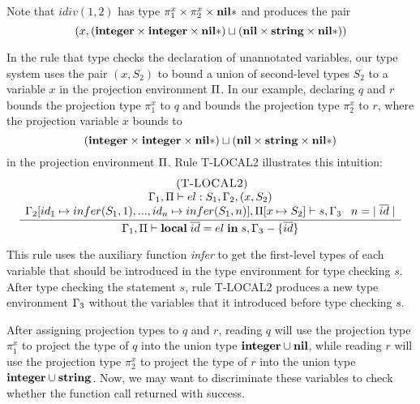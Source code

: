 Note that $idiv(1, 2)$ has type
$\pi_{1}^{x} \times \pi_{2}^{x} \times \mathbf{nil}{*}$ and produces the pair
\[
(x,(\mathbf{integer} \times \mathbf{integer} \times \mathbf{nil}{*}) \sqcup (\mathbf{nil} \times \mathbf{string} \times \mathbf{nil}{*})) 
\]

In the rule that type checks the declaration of unannotated variables,
our type system uses the pair $(x,S_{2})$ to bound a union of
second-level types $S_{2}$ to a variable $x$ in the projection
environment $\Pi$.
In our example, declaring $q$ and $r$
bounds the projection type $\pi_{1}^{x}$ to $q$ and
bounds the projection type $\pi_{2}^{x}$ to $r$,
where the projection variable $x$ bounds to 
\[
(\mathbf{integer} \times \mathbf{integer} \times \mathbf{nil}{*}) \sqcup (\mathbf{nil} \times \mathbf{string} \times \mathbf{nil}{*})
\]
in the projection environment $\Pi$.
Rule \textsc{T-LOCAL2} illustrates this intuition:
\[
\begin{array}{c}
\; (\textsc{T-LOCAL2})\\
\dfrac{\begin{array}{c}
       \Gamma_{1}, \Pi \vdash el:S_{1}, \Gamma_{2}, (x,S_{2})\\
       \Gamma_{2}[id_{1} \mapsto infer(S_{1},1), ..., id_{n} \mapsto infer(S_{1},n)], \Pi[x \mapsto S_{2}] \vdash s, \Gamma_{3} \;\;\;
       n = |\;\overline{id}\;|  
       \end{array}}
      {\Gamma_{1}, \Pi \vdash \mathbf{local} \; \overline{id} = el \; \mathbf{in} \; s, \Gamma_{3} - \{\overline{id}\}}
\end{array}
\]

This rule uses the auxiliary function \emph{infer} to get the
first-level types of each variable that should be introduced in
the type environment for type checking $s$.
After type checking the statement $s$, rule \textsc{T-LOCAL2} produces a
new type environment $\Gamma_{3}$ without the variables that it introduced
before type checking $s$.

After assigning projection types to $q$ and $r$, reading $q$ will
use the projection type $\pi_{1}^{x}$ to project the type of $q$
into the union type $\mathbf{integer} \cup \mathbf{nil}$, while reading $r$ will
use the projection type $\pi_{2}^{x}$ to project the type of $r$
into the union type $\mathbf{integer} \cup \mathbf{string}$.
Now, we may want to discriminate these variables to check whether
the function call returned with success.

